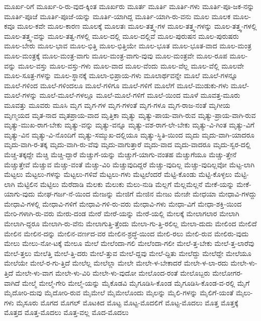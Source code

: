 {ಮೂರ್ಖ-ರಿಗೆ
ಮೂರ್ಖ-ರಿ-ರು-ವುದ-ಕ್ಕಿಂತ
ಮೂರ್ಖರು
ಮೂರ್ತ
ಮೂರ್ತಿ
ಮೂರ್ತಿ-ಗಳು
ಮೂರ್ತಿ-ಪೂ-ಜಕ-ನನ್ನು
ಮೂರ್ತಿ-ಪೂಜೆ
ಮೂರ್ತಿ-ಪೂಜೆ-ಯನ್ನು
ಮೂರ್ತಿ-ಯಾಗಿದ್ದ
ಮೂರ್ತಿ-ಯಾಗಿ-ರು-ವನು
ಮೂಲ
ಮೂಲಕ
ಮೂಲ-ಕವೂ
ಮೂಲ-ಕವೇ
ಮೂಲ-ಕಾರಣ
ಮೂಲಕ್ಕೆ
ಮೂಲತಃ
ಮೂಲ-ತತ್ತ್ವ-ಗಳ
ಮೂಲ-ತತ್ತ್ವ-ಗಳನ್ನು
ಮೂಲ-ತತ್ತ್ವ-ಗಳಲ್ಲಿ
ಮೂಲ-ತತ್ತ್ವ-ವನ್ನು
ಮೂಲ-ತತ್ವ-ಗಳಲ್ಲಿ
ಮೂಲ-ದಲ್ಲಿ
ಮೂಲ-ದಲ್ಲಿವೆ
ಮೂಲ-ಪುರುಷನ
ಮೂಲ-ಪುರುಷರು
ಮೂಲ-ಬೇರು
ಮೂಲ-ಭಾವ
ಮೂಲ-ಭಿತ್ತಿ
ಮೂಲ-ಭಿತ್ತಿಯೇ
ಮೂಲ-ಭೂತ
ಮೂಲ-ಭೂತ-ವಾದ
ಮೂಲ-ಮಂತ್ರ
ಮೂಲ-ಮಂತ್ರಕ್ಕೆ
ಮೂಲ-ಮಂತ್ರ-ವಾಗು
ಮೂಲ-ಮಂತ್ರ-ವಾಗು-ವುವು
ಮೂಲ-ಮಂತ್ರವೇ
ಮೂಲ-ರೂಪ
ಮೂಲ-ವನ್ನು
ಮೂಲ-ವಸ್ತು
ಮೂಲ-ವಸ್ತು-ಗಳು
ಮೂಲ-ವಾದ
ಮೂಲ-ವೆಂದು
ಮೂಲ-ವೆಲ್ಲ
ಮೂಲ-ವೆಲ್ಲಿ
ಮೂಲವೇ
ಮೂಲ-ಸೂತ್ರ-ಗಳನ್ನು
ಮೂಲ-ಸ್ಥಾನಕ್ಕೆ
ಮೂಲಾ-ಭಿಪ್ರಾಯ-ಗಳು
ಮೂಲಾರ್ಥವನ್ನೇ
ಮೂಲೆ
ಮೂಲೆ-ಗಳನ್ನೂ
ಮೂಲೆ-ಗಳಿಂದ
ಮೂಲೆ-ಗಳಿಂದಲೂ
ಮೂಲೆ-ಗಳಿಗೂ
ಮೂಲೆ-ಗಳಿಗೆ
ಮೂಲೆಗೆ
ಮೂಲೆ-ಮುಡುಕು-ಗಳು
ಮೂಲೆ-ಮೂಲೆ-ಗಳನ್ನು
ಮೂಲೆ-ಮೂಲೆ-ಗಳಲ್ಲೂ
ಮೂಲೆ-ಮೂಲೆ-ಗಳಿಗೆ
ಮೂಲೆ-ಯಿಂದ
ಮೂಳೆ
ಮೂವತ್ತ-ಮೂರು
ಮೂವತ್ತು
ಮೂವರು
ಮೂಸಿ
ಮೃಗ
ಮೃಗ-ಗಳ
ಮೃಗ-ಗಳಂತೆ
ಮೃಗ-ಗಳೂ
ಮೃಗ-ರಾಜ-ನಂತೆ
ಮೃಗೀಯ
ಮೃಣ್ಮಯದ
ಮೃತ-ನಾದ
ಮೃತಪ್ರಾಯ-ವಾದ
ಮೃತ್ತಿಕಾ
ಮೃತ್ಯು
ಮೃತ್ಯು-ಪಾಯ-ವಾಗಿ-ರುವ
ಮೃತ್ಯು-ಪ್ರಾಯ-ವಾಗಿ-ರುವ
ಮೃತ್ಯು-ಮುಖ-ರಾಗ-ಬೇಕು
ಮೃತ್ಯು-ವನ್ನು
ಮೃತ್ಯು-ವನ್ನೂ
ಮೃತ್ಯು-ವಶ-ರಾಗ-ಲೇ-ಬೇಕು
ಮೃತ್ಯು-ವಿ-ಗಿಂತ
ಮೃತ್ಯು-ವಿಗೆ
ಮೃತ್ಯು-ವಿನ
ಮೃತ್ಯು-ವಿ-ನೊಂದಿಗೆ
ಮೃತ್ಯು-ಸಮ್ಮುಖ-ದಲ್ಲಿಯೂ
ಮೃತ್ಯು-ಸ್ಥಿತಿ-ಯಿಂದ
ಮೃದು
ಮೃದು-ವಾಗಿ-ಯಾದರೂ
ಮೃದು-ವಾಗಿ-ರ-ತಕ್ಕ
ಮೃದು-ವಾಗಿ-ರು-ವೆವು
ಮೃದು-ವಾಗುತ್ತಾರೆ
ಮೃದು-ವಾದ
ಮೃದು-ವಾದರೂ
ಮೃದು-ಸ್ವರ-ದಲ್ಲಿ
ಮೆಚ್ಚ-ತಕ್ಕದ್ದೇ
ಮೆಚ್ಚಿ
ಮೆಚ್ಚಿ-ದ್ದಾರೆ
ಮೆಚ್ಚುಗೆ-ಯನ್ನು
ಮೆಚ್ಚುಗೆ-ಯಾಗು-ವಂತಹ
ಮೆಚ್ಚುಗೆಯೂ
ಮೆಚ್ಚು-ತ್ತೇನೆ
ಮೆಚ್ಚುತ್ತೇವೆ
ಮೆಚ್ಚುವ
ಮೆಚ್ಚು-ವಂತೆ
ಮೆಚ್ಚು-ವಿರಿ
ಮೆಚ್ಚುವುದಿದ್ದರೆ
ಮೆಚ್ಚು-ವುದಿಲ್ಲ
ಮೆಚ್ಚು-ವುದಿಲ್ಲವೋ
ಮೆಟ್ಟ-ಲಾಗಿ
ಮೆಟ್ಟಲು
ಮೆಟ್ಟಲು-ಗಳನ್ನು
ಮೆಟ್ಟಲು-ಗಳಿವೆ
ಮೆಟ್ಟಲು-ಗಳು
ಮೆಟ್ಟಲೆಂದರೆ
ಮೆಟ್ಟಿ-ಕೊಂಡು
ಮೆಟ್ಟಿ-ಕೊಳ್ಳಲು
ಮೆಟ್ಟಿ-ಲಾಗಿ
ಮೆಟ್ಟಿಲಿನ
ಮೆಟ್ಟಿಲು
ಮೆರೆದಾಡಿ
ಮೆಲಕು
ಮೆಲುಕು
ಮೆಲು-ನುಡಿ
ಮೆಲ್ಲಗೆ
ಮೆಲ್ಲಮೆಲ್ಲನೆ
ಮೇಕೆ-ಯನ್ನು
ಮೇಕೆ-ಯಾಗು-ವುದು
ಮೇಘ-ಗರ್ಜ-ನೆ-ಯಿಂದ
ಮೇಜನ್ನು
ಮೇಜಿಗೆ
ಮೇಜಿನ
ಮೇಜು
ಮೇಜೇ
ಮೇಧಯಾ
ಮೇಧಾವಿ-ಗಳದ್ದು
ಮೇಧಾವಿ-ಗಳಲ್ಲಿ
ಮೇಧಾವಿ-ಗಳಿಗೆ
ಮೇಧಾವಿ-ಗಳಿ-ರು-ವರು
ಮೇಧಾವಿ-ಗಳು
ಮೇಧಾ-ವಿಗೆ
ಮೇಧಾ-ಶಕ್ತಿ-ಯಿಂದ
ಮೇರಿ-ಗಳಾಗಿ-ರು-ವರು
ಮೇರು-ದಂಡ
ಮೇರೆ
ಮೇರೆ-ಯನ್ನು
ಮೇರೆ-ಯಲ್ಲಿ
ಮೇಲಕ್ಕೆ
ಮೇಲಾಗಲಾರ
ಮೇಲಾಗಿ
ಮೇಲಾಗಿ-ದ್ದರೂ
ಮೇಲಾಗಿ-ರು-ವೆನು
ಮೇಲಾಗುತ್ತಿ-ತ್ತೆಂದು
ಮೇಲಾ-ಗು-ತ್ತಿ-ರಲಿಲ್ಲ
ಮೇಲಾ-ದುದು
ಮೇಲಿಂದ
ಮೇಲಿದೆ
ಮೇಲಿನ
ಮೇಲಿನ-ದನ್ನು
ಮೇಲಿನ-ವರ್ಣದ-ವರ
ಮೇಲಿನ-ಶ್ರದ್ಧೆ-ಯಿಂದ
ಮೇಲಿ-ರಲು
ಮೇಲಿ-ರುವ
ಮೇಲಿರು-ವುದು
ಮೇಲು
ಮೇಲು-ನೋ-ಟಕ್ಕೆ
ಮೇಲೂ
ಮೇಲೆ
ಮೇಲೆಂದಾ-ಗಲಿ
ಮೇಲೆಂದಾ-ಗಲೀ
ಮೇಲೆ-ತ್ತ-ಬೇಕು
ಮೇಲೆ-ತ್ತ-ಲಾರೆವು
ಮೇಲೆ-ತ್ತಲು
ಮೇಲೆತ್ತಿ
ಮೇಲೆ-ತ್ತಿ-ದರು
ಮೇಲೆ-ತ್ತುವ
ಮೇಲೆ-ದ್ದವು
ಮೇಲೆ-ದ್ದಿತು
ಮೇಲೆದ್ದು
ಮೇಲೆದ್ದೇ
ಮೇಲೆಯೂ
ಮೇಲೆಯೇ
ಮೇಲೆ-ರ-ಗು-ತ್ತಿದೆ
ಮೇಲೆಲ್ಲ
ಮೇಲೆಲ್ಲಾ
ಮೇಲೇ
ಮೇಲೇ-ಳ-ಬೇಕಾದರೆ
ಮೇಲೇ-ಳ-ಲಾ-ರದು
ಮೇಲೇ-ಳು-ತ್ತಿದೆ
ಮೇಲೇ-ಳು-ವಾಗ
ಮೇಲೇ-ಳು-ವಿರಿ
ಮೇಲೇ-ಳು-ವುದೋ
ಮೇಲೊಂದ-ರಂತೆ
ಮೇಲೊಬ್ಬರು
ಮೇಲೋಗರ-ವಾಗಿದೆ
ಮೇಲ್ಮೆ
ಮೇಲ್ಮೆ-ಗೇರಿ
ಮೇಲ್ಮೆ-ಯನ್ನು
ಮೈಕೊಡವಿ
ಮೈಗೂಡಿಸಿ-ಕೊಂಡ
ಮೈಗೂಡಿಸಿ-ಕೊಂಡ-ವ-ರಲ್ಲಿ
ಮೈಗೆ
ಮೈದೋರಿ-ದುವು
ಮೈದೋರಿ-ರುವ
ಮೈಮೇಲೆ
ಮೈಮೇಲೊಂದು
ಮೈಲನ್ನು
ಮೈಲಿ-ಗಳನ್ನು
ಮೈಲಿಗೆ-ಯಂತೆ
ಮೈಲು-ಗಳು
ಮೈಸೂರು
ಮೊಗದ
ಮೊಗಲ್
ಮೊಟಕಿದ
ಮೊಟ್ಟ
ಮೊಟ್ಟ-ಮೊದಲಿಗೆ
ಮೊಟ್ಟ-ಮೊದಲು
ಮೊತ್ತ
ಮೊತ್ತಕ್ಕೆ
ಮೊತ್ತದ
ಮೊತ್ತ-ಮೊದಲು
ಮೊತ್ತ-ವಲ್ಲ
ಮೊದ-ಮೊದಲು
}
